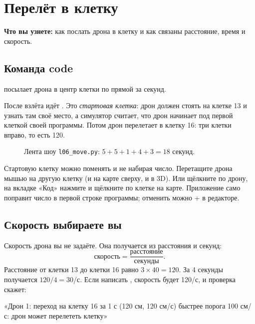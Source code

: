 \chapter{Перелёт в клетку}\label{ch:peretyot}

\textbf{Что вы узнете:} как послать дрона в клетку и как связаны расстояние, время и скорость.

\section{Команда code}

 посылает дрона в центр клетки  по прямой за  секунд.


После взлёта идёт . Это \emph{стартовая клетка}: дрон должен стоять на клетке 13 и узнать там своё место, а симулятор считает, что дрон начинает под первой клеткой своей программы. Потом дрон перелетает в клетку 16: три клетки вправо, то есть 120\cm.

\begin{figure}[H]
  \centering
  
  \caption{Лента шоу \texttt{l06\_move.py}: $5 + 5 + 1 + 4 + 3 = 18$ секунд.}\label{fig:time}
\end{figure}

\begin{zametka}
Стартовую клетку можно поменять и не набирая число. Перетащите дрона мышью на другую клетку (и на карте сверху, и в 3D). Или щёлкните по дрону, на вкладке «Код» нажмите  и щёлкните по клетке на карте. Приложение само поправит число в первой строке  программы; отменить можно + в редакторе.
\end{zametka}

\section{Скорость выбираете вы}

Скорость дрона вы не задаёте. Она получается из расстояния и секунд:
\[
  \text{скорость} = \frac{\text{расстояние}}{\text{секунды}}.
\]
Расстояние от клетки 13 до клетки 16 равно $3\times 40 = 120$\cm. За 4 секунды получается $120/4 = 30$\cm/с. Если написать , скорость будет 120\cm/с, и проверка скажет:

\begin{center}
\small
«Дрон 1: переход на клетку 16 за 1 с (120 см, 120 см/с) быстрее порога 100 см/с: дрон может перелететь клетку»
\end{center}

